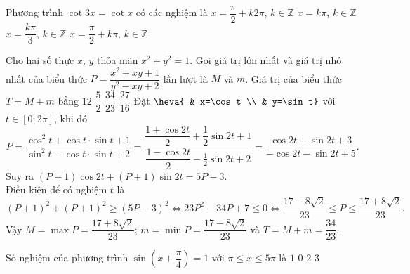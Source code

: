 \begin{ex}%
Phương trình $\cot 3x=\cot x$ có các nghiệm là
\choice
{$x=\dfrac{\pi}{2}+k2\pi$, $k \in \mathbb{Z}$}
{$x=k\pi$, $k \in \mathbb{Z}$}
{$x=\dfrac{k\pi}{3}$, $k \in \mathbb{Z}$}
{\True $x=\dfrac{\pi}{2}+k\pi$, $k \in \mathbb{Z}$}
\end{ex}

\begin{ex}%
Cho hai số thực $x$, $y$ thỏa mãn $x^{2}+y^{2}=1$. Gọi giá trị lớn nhất và giá trị nhỏ nhất của biểu thức $P=\dfrac{x^{2}+x y+1}{y^{2}-x y+2}$ lần lượt là $M$ và $m$. Giá trị của biểu thức $T=M+m$ bằng
\choice
{$12$}
{$\dfrac{5}{2}$}
{\True $\dfrac{34}{23}$}
{$\dfrac{27}{16}$}
\loigiai
{
Đặt $\heva{ & x=\cos t \\ & y=\sin t}$ với $t\in[0;2\pi]$, khi đó
\[ P=\dfrac{\cos ^{2} t+\cos t \cdot \sin t+1}{\sin ^{2} t-\cos t \cdot \sin t+2}=\dfrac{\dfrac{1+\cos 2 t}{2}+\dfrac{1}{2} \sin 2 t+1}{\dfrac{1-\cos 2 t}{2}-\frac{1}{2} \sin 2 t+2}=\dfrac{\cos 2 t+\sin 2 t+3}{-\cos 2 t-\sin 2 t+5}.\]
Suy ra $(P+1) \cos 2 t+(P+1) \sin 2 t=5 P-3$. \\
Điều kiện để có nghiệm $t$ là \[(P+1)^{2}+(P+1)^{2} \geq(5 P-3)^{2} \Leftrightarrow 23 P^{2}-34 P+7 \leq 0 \Leftrightarrow \frac{17-8 \sqrt{2}}{23} \leq P \leq \frac{17+8 \sqrt{2}}{23}.\]
Vậy $M=\max P=\dfrac{17+8 \sqrt{2}}{23} $; $m=\min P=\dfrac{17-8 \sqrt{2}}{23}$ và $T=M+m=\dfrac{34}{23}$.
}
\end{ex}

\begin{ex}%
Số nghiệm của phương trình $\sin \left( x+\dfrac{\pi}{4} \right)=1$ với $\pi \le x\le 5\pi $ là
\choice
{$1$}
{$0$}
{$2$}
{\True $3$}
\end{ex}

